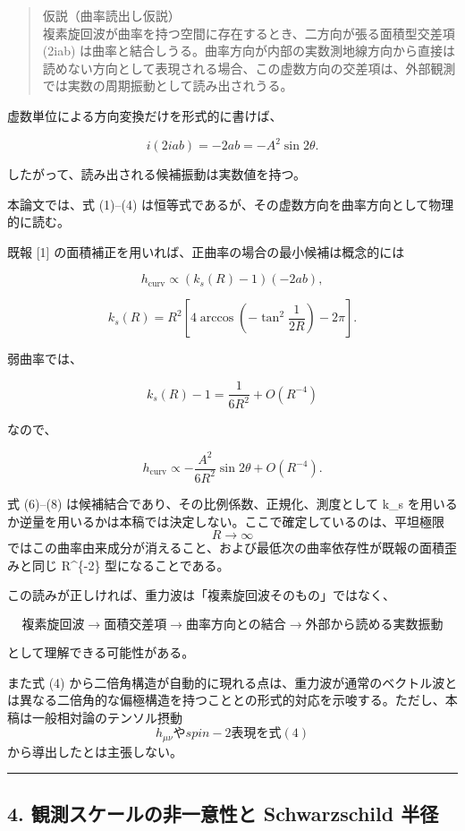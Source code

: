 \documentclass[
  a4paper,
]{ltjsarticle}
\begin{document}
\begin{quote}
仮説（曲率読出し仮説）\\
複素旋回波が曲率を持つ空間に存在するとき、二方向が張る面積型交差項
(2iab)
は曲率と結合しうる。曲率方向が内部の実数測地線方向から直接は読めない方向として表現される場合、この虚数方向の交差項は、外部観測では実数の周期振動として読み出されうる。
\end{quote}

虚数単位による方向変換だけを形式的に書けば、

\[i(2iab)=-2ab=-A^2\sin2\theta. \tag{5}\]

したがって、読み出される候補振動は実数値を持つ。

本論文では、式 (1)--(4)
は恒等式であるが、その虚数方向を曲率方向として物理的に読む。

既報 {[}1{]} の面積補正を用いれば、正曲率の場合の最小候補は概念的には

\[h_\text{curv} \propto (k_s(R)-1)(-2ab), \tag{6}\]

\[k_s(R) = R^2 \left[4\arccos\left(-\tan^2\frac{1}{2R}\right)-2\pi\right]. \tag{7}\]

弱曲率では、

\[k_s(R)-1 = \frac{1}{6R^2}+O(R^{-4})\]

なので、

\[h_\text{curv} \propto -\frac{A^2}{6R^2}\sin2\theta +O(R^{-4}). \tag{8}\]

式 (6)--(8) は候補結合であり、その比例係数、正規化、測度として k\_s
を用いるか逆量を用いるかは本稿では決定しない。ここで確定しているのは、平坦極限
\[R\to\infty\]
ではこの曲率由来成分が消えること、および最低次の曲率依存性が既報の面積歪みと同じ
R\^{}\{-2\} 型になることである。

この読みが正しければ、重力波は「複素旋回波そのもの」ではなく、

\[\boxed{\text{複素旋回波} \to \text{面積交差項} \to \text{曲率方向との結合} \to \text{外部から読める実数振動}}\]

として理解できる可能性がある。

また式 (4)
から二倍角構造が自動的に現れる点は、重力波が通常のベクトル波とは異なる二倍角的な偏極構造を持つこととの形式的対応を示唆する。ただし、本稿は一般相対論のテンソル摂動
\[h_{\mu\nu} や spin-2 表現を式 (4)\] から導出したとは主張しない。

\begin{center}\rule{0.5\linewidth}{0.5pt}\end{center}

\subsection{4. 観測スケールの非一意性と Schwarzschild
半径}\label{ux89b3ux6e2cux30b9ux30b1ux30fcux30ebux306eux975eux4e00ux610fux6027ux3068-schwarzschild-ux534aux5f84}
\end{document}
